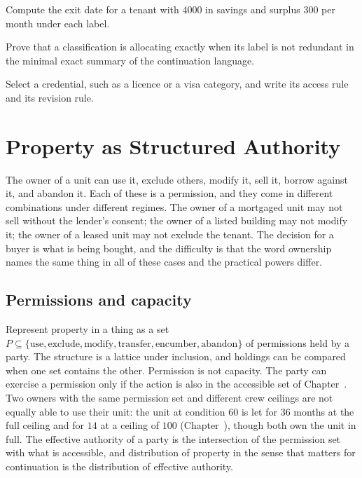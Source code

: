 \begin{exercise}
Compute the exit date for a tenant with $4000$ in savings and surplus $300$ per month under each label.
\end{exercise}
\begin{exercise}
Prove that a classification is allocating exactly when its label is not redundant in the minimal exact summary of the continuation language.
\end{exercise}
\begin{exercise}
Select a credential, such as a licence or a visa category, and write its access rule and its revision rule.
\end{exercise}

\chapter{Property as Structured Authority}\label{ch:27}

The owner of a unit can use it, exclude others, modify it, sell it, borrow against it, and abandon it. Each of these is a permission, and they come in different combinations under different regimes. The owner of a mortgaged unit may not sell without the lender's consent; the owner of a listed building may not modify it; the owner of a leased unit may not exclude the tenant. The decision for a buyer is what is being bought, and the difficulty is that the word ownership names the same thing in all of these cases and the practical powers differ.

\section{Permissions and capacity}

Represent property in a thing as a set $P\subseteq\{\text{use},\text{exclude},\text{modify},\text{transfer},\text{encumber},\text{abandon}\}$ of permissions held by a party. The structure is a lattice under inclusion, and holdings can be compared when one set contains the other. Permission is not capacity. The party can exercise a permission only if the action is also in the accessible set of Chapter~. Two owners with the same permission set and different crew ceilings are not equally able to use their unit: the unit at condition $60$ is let for $36$ months at the full ceiling and for $14$ at a ceiling of $100$ (Chapter~), though both own the unit in full. The effective authority of a party is the intersection of the permission set with what is accessible, and distribution of property in the sense that matters for continuation is the distribution of effective authority.

